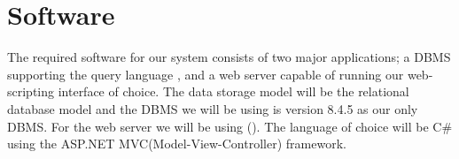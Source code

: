 \section{Software}
\label{sec:software}

The required software for our system consists of two major applications; a DBMS supporting the query language \sql[], and a web server capable of running our web-scripting interface of choice. 
The data storage model will be the relational database model and the DBMS we will be using is \posgresql[] version 8.4.5 as our only DBMS. 
For the web server we will be using  \wholeiis[] (\iis[]). 
The language of choice will be C\# using the ASP.NET MVC(Model-View-Controller) framework. \\

